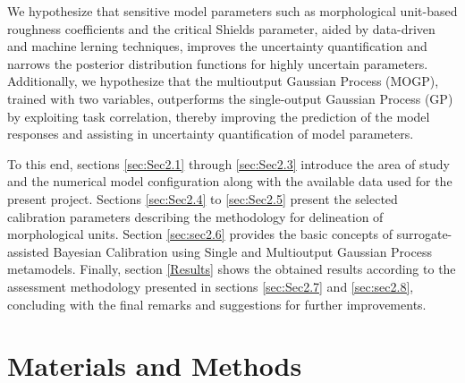 \documentclass[draft,linenumbers,onecolumn]{agujournal2019} %
\begin{document}
We hypothesize that sensitive model parameters such as morphological unit-based roughness coefficients and the critical Shields parameter, aided by data-driven and machine lerning techniques, improves the uncertainty quantification and narrows the posterior distribution functions for highly uncertain parameters. Additionally, we hypothesize that the multioutput Gaussian Process (MOGP), trained with two variables, outperforms the single-output Gaussian Process (GP) by exploiting task correlation, thereby improving the prediction of the model responses and assisting in uncertainty quantification of model parameters.

 
To this end, sections  \ref{sec:Sec2.1} through \ref{sec:Sec2.3} introduce the area of study and the numerical model configuration along with the available data used for the present project. Sections \ref{sec:Sec2.4} to \ref{sec:Sec2.5} present the selected calibration parameters describing the methodology for delineation of morphological units. Section \ref{sec:sec2.6} provides the basic concepts of surrogate-assisted Bayesian Calibration using Single and Multioutput Gaussian Process metamodels. Finally, section \ref{Results} shows the obtained results according to the assessment methodology presented in sections \ref{sec:Sec2.7} and \ref{sec:sec2.8}, concluding with the final remarks and suggestions for further improvements.


\section{Materials and Methods} 
\label{Materials}
\end{document}
